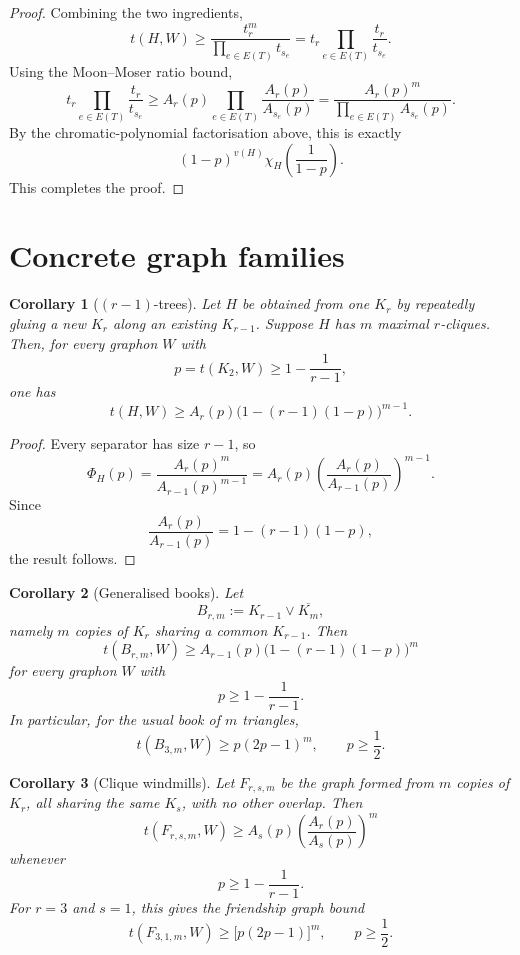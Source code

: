 \documentclass[11pt]{article}
\newtheorem{corollary}{Corollary}
\newcommand{\K}{K}
\begin{document}
\begin{proof}
Combining the two ingredients,
\[
t(H,W)
\ge
\frac{t_r^m}{\prod_{e\in E(T)}t_{s_e}}
=
t_r\prod_{e\in E(T)}\frac{t_r}{t_{s_e}}.
\]
Using the Moon--Moser ratio bound,
\[
t_r\prod_{e\in E(T)}\frac{t_r}{t_{s_e}}
\ge
A_r(p)\prod_{e\in E(T)}\frac{A_r(p)}{A_{s_e}(p)}
=
\frac{A_r(p)^m}{\prod_{e\in E(T)}A_{s_e}(p)}.
\]
By the chromatic-polynomial factorisation above, this is exactly
\[
(1-p)^{v(H)}
\chi_H\!\left(\frac1{1-p}\right).
\]
This completes the proof.
\end{proof}

\section{Concrete graph families}

\begin{corollary}[\((r-1)\)-trees]
Let \(H\) be obtained from one \(\K_r\) by repeatedly gluing a new \(\K_r\) along
an existing \(\K_{r-1}\). Suppose \(H\) has \(m\) maximal \(r\)-cliques. Then,
for every graphon \(W\) with
\[
p=t(\K_2,W)\ge 1-\frac1{r-1},
\]
one has
\[
t(H,W)
\ge
A_r(p)\bigl(1-(r-1)(1-p)\bigr)^{m-1}.
\]
\end{corollary}

\begin{proof}
Every separator has size \(r-1\), so
\[
\Phi_H(p)
=
\frac{A_r(p)^m}{A_{r-1}(p)^{m-1}}
=
A_r(p)
\left(\frac{A_r(p)}{A_{r-1}(p)}\right)^{m-1}.
\]
Since
\[
\frac{A_r(p)}{A_{r-1}(p)}
=
1-(r-1)(1-p),
\]
the result follows.
\end{proof}

\begin{corollary}[Generalised books]
Let
\[
B_{r,m}:=\K_{r-1}\vee \overline{\K_m},
\]
namely \(m\) copies of \(\K_r\) sharing a common \(\K_{r-1}\). Then
\[
t(B_{r,m},W)
\ge
A_{r-1}(p)\bigl(1-(r-1)(1-p)\bigr)^m
\]
for every graphon \(W\) with
\[
p\ge 1-\frac1{r-1}.
\]
In particular, for the usual book of \(m\) triangles,
\[
t(B_{3,m},W)\ge p(2p-1)^m,
\qquad p\ge \frac12.
\]
\end{corollary}

\begin{corollary}[Clique windmills]
Let \(F_{r,s,m}\) be the graph formed from \(m\) copies of \(\K_r\), all sharing
the same \(\K_s\), with no other overlap. Then
\[
t(F_{r,s,m},W)
\ge
A_s(p)\left(\frac{A_r(p)}{A_s(p)}\right)^m
\]
whenever
\[
p\ge 1-\frac1{r-1}.
\]
For \(r=3\) and \(s=1\), this gives the friendship graph bound
\[
t(F_{3,1,m},W)
\ge
\bigl[p(2p-1)\bigr]^m,
\qquad p\ge \frac12.
\]
\end{corollary}
\end{document}
